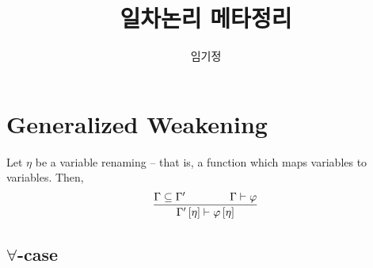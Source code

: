 \documentclass[12pt]{paper}
\title{일차논리 메타정리}
\author{임기정}
\begin{document}
\maketitle

\section{Generalized Weakening}

Let $\eta$ be a variable renaming -- that is, a function which maps variables to variables. Then,
$$\infer{\Gamma^{\prime} \left[ \eta \right] \vdash \varphi \left[ \eta \right]}{\Gamma \subseteq \Gamma^{\prime} & \qquad & \Gamma \vdash \varphi}$$

\subsection[]{$\forall$-case}
\end{document}
